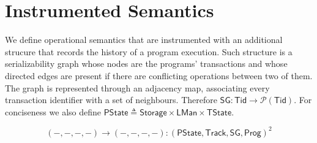 \section{Instrumented Semantics}

We define operational semantics that are instrumented with an additional strucure that records the history of a program execution. Such structure is a serializability graph whose nodes are the programs' transactions and whose directed edges are present if there are conflicting operations between two of them. The graph is represented through an adjacency map, associating every transaction identifier with a set of neighbours. Therefore $\mathsf{SG} : \mathsf{Tid} \rightarrow \mathcal{P}(\mathsf{Tid})$. For conciseness we also define $\mathsf{PState} \triangleq \mathsf{Storage} \times \mathsf{LMan} \times \mathsf{TState}$.

\[
(-, -, -, -) \rightarrow (-, -, -, -) : (\mathsf{PState}, \mathsf{Track}, \mathsf{SG}, \mathsf{Prog})^2
\]